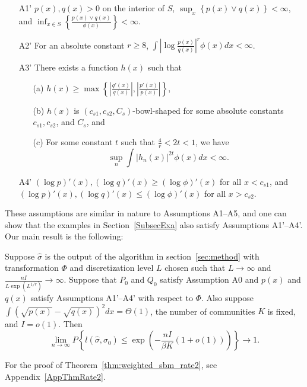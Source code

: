 \documentclass{article}
\begin{document}
\begin{enumerate}
\item[A1'] $p(x), q(x) > 0$ on the interior of $S$, $\sup_x \left\{p(x) \vee q(x)\right\} < \infty$, and $\inf_{x \in S} \left\{\frac{p(x) \vee q(x)}{\phi(x)}\right\} < \infty$. 
\item[A2'] For an absolute constant $r \geq 8$, $\int \left| \log \frac{p(x)}{q(x)} \right|^r \phi(x) dx < \infty$.
\item[A3'] There exists a function $h(x)$ such that
\begin{itemize}
\item[(a)] $h(x) \geq \max \left\{  \left|\frac{q'(x)}{q(x)} \right|,  \left|\frac{p'(x)}{p(x)}\right| \right\} $,
\item[(b)] $h(x)$ is $(c_{s1}, c_{s2}, C_s)$-bowl-shaped for some absolute constants $c_{s1}, c_{s2}$, and $C_s$, and
\item[(c)] For some constant $t$ such that $\frac{4}{r} < 2t < 1$, we have
$$ \sup_n \int |h_n(x)|^{2t} \phi(x) dx < \infty.$$
\end{itemize}

\item[A4']  $(\log p)'(x), (\log q)'(x) \geq (\log \phi)'(x)$ for all $x < c_{s1}$, and $ (\log p)'(x), (\log q)'(x) \leq (\log \phi)'(x)$ for all $x > c_{s2}$.
\end{enumerate}

These assumptions are similar in nature to Assumptions A1--A5, and one can show that the examples in Section~\ref{SubsecExa} also satisfy Assumptions A1'--A4'. Our main result is the following:

\begin{theorem}
\label{thm:weighted_sbm_rate2}
Suppose $\hat{\sigma}$ is the output of the algorithm in section~\ref{sec:method} with transformation $\Phi$ and discretization level $L$ chosen such that $L \rightarrow \infty$ and $\frac{n I}{ L \exp(L^{1/r}) } \rightarrow \infty$. Suppose that $P_0$ and $Q_0$ satisfy Assumption A0 and $p(x)$ and $q(x)$ satisfy Assumptions A1'--A4' with respect to $\Phi$. Also suppose $\int (\sqrt{p(x)} - \sqrt{q(x)})^2 dx = \Theta(1)$, the number of communities $K$ is fixed, and $I = o(1)$. Then
\[
\lim_{n \rightarrow \infty} P \left\{
     l(\hat{\sigma}, \sigma_0) \leq \exp\left( - \frac{nI}{\beta K} (1 + o(1)) \right)
    \right\} \rightarrow 1.
\]
\end{theorem}
For the proof of Theorem~\ref{thm:weighted_sbm_rate2}, see Appendix~\ref{AppThmRate2}.
\end{document}
